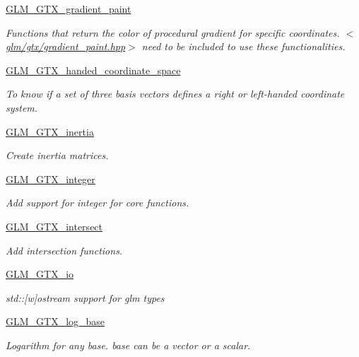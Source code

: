 \begin{DoxyCompactItemize}
\hyperlink{group__gtx__gradient__paint}{G\-L\-M\-\_\-\-G\-T\-X\-\_\-gradient\-\_\-paint}
\begin{DoxyCompactList}\small\item\em Functions that return the color of procedural gradient for specific coordinates. $<$\hyperlink{gradient__paint_8hpp}{glm/gtx/gradient\-\_\-paint.\-hpp}$>$ need to be included to use these functionalities. \end{DoxyCompactList}\item 
\hyperlink{group__gtx__handed__coordinate__space}{G\-L\-M\-\_\-\-G\-T\-X\-\_\-handed\-\_\-coordinate\-\_\-space}
\begin{DoxyCompactList}\small\item\em To know if a set of three basis vectors defines a right or left-\/handed coordinate system. \end{DoxyCompactList}\item 
\hyperlink{group__gtx__inertia}{G\-L\-M\-\_\-\-G\-T\-X\-\_\-inertia}
\begin{DoxyCompactList}\small\item\em Create inertia matrices. \end{DoxyCompactList}\item 
\hyperlink{group__gtx__integer}{G\-L\-M\-\_\-\-G\-T\-X\-\_\-integer}
\begin{DoxyCompactList}\small\item\em Add support for integer for core functions. \end{DoxyCompactList}\item 
\hyperlink{group__gtx__intersect}{G\-L\-M\-\_\-\-G\-T\-X\-\_\-intersect}
\begin{DoxyCompactList}\small\item\em Add intersection functions. \end{DoxyCompactList}\item 
\hyperlink{group__gtx__io}{G\-L\-M\-\_\-\-G\-T\-X\-\_\-io}
\begin{DoxyCompactList}\small\item\em std\-:\-:\mbox{[}w\mbox{]}ostream support for glm types \end{DoxyCompactList}\item 
\hyperlink{group__gtx__log__base}{G\-L\-M\-\_\-\-G\-T\-X\-\_\-log\-\_\-base}
\begin{DoxyCompactList}\small\item\em Logarithm for any base. base can be a vector or a scalar. \end{DoxyCompactList}\item 

\end{DoxyCompactItemize}
